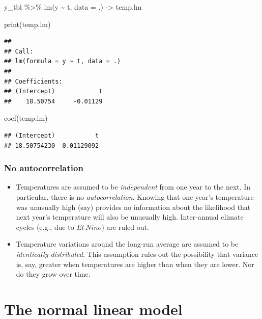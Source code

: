 \documentclass[
]{book}
\newenvironment{Shaded}{\begin{snugshade}}{\end{snugshade}}
\newcommand{\AttributeTok}[1]{\textcolor[rgb]{0.77,0.63,0.00}{#1}}
\newcommand{\FunctionTok}[1]{\textcolor[rgb]{0.00,0.00,0.00}{#1}}
\newcommand{\NormalTok}[1]{#1}
\newcommand{\OtherTok}[1]{\textcolor[rgb]{0.56,0.35,0.01}{#1}}
\newcommand{\SpecialCharTok}[1]{\textcolor[rgb]{0.00,0.00,0.00}{#1}}
\begin{document}
\begin{Shaded}
\begin{Highlighting}[]
\NormalTok{y\_tbl }\SpecialCharTok{\%\textgreater{}\%} \FunctionTok{lm}\NormalTok{(y }\SpecialCharTok{\textasciitilde{}}\NormalTok{ t, }\AttributeTok{data =}\NormalTok{ .) }\OtherTok{{-}\textgreater{}}\NormalTok{ temp.lm}

\FunctionTok{print}\NormalTok{(temp.lm)}
\end{Highlighting}
\end{Shaded}

\begin{verbatim}
## 
## Call:
## lm(formula = y ~ t, data = .)
## 
## Coefficients:
## (Intercept)            t  
##    18.50754     -0.01129
\end{verbatim}

\begin{Shaded}
\begin{Highlighting}[]
\FunctionTok{coef}\NormalTok{(temp.lm)}
\end{Highlighting}
\end{Shaded}

\begin{verbatim}
## (Intercept)           t 
## 18.50754230 -0.01129092
\end{verbatim}

\hypertarget{no-autocorrelation}{%
\subsection{No autocorrelation}\label{no-autocorrelation}}

\begin{itemize}
\item
  Temperatures are assumed to be \emph{independent} from one year to the next. In particular, there is no \emph{autocorrelation}. Knowing that one year's temperature was unusually high (say) provides no information about the likelihood that next year's temperature will also be unusually high. Inter-annual climate cycles (e.g., due to \(El\ Ni\tilde{n}o\)) are ruled out.
\item
  Temperature variations around the long-run average are assumed to be \emph{identically distributed}. This assumption rules out the possibility that variance is, say, greater when temperatures are higher than when they are lower. Nor do they grow over time.
\end{itemize}

\hypertarget{the-normal-linear-model}{%
\chapter{The normal linear model}\label{the-normal-linear-model}}
\end{document}
